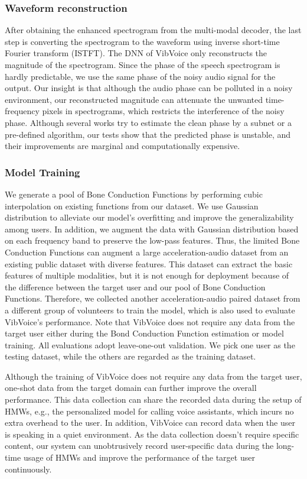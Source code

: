 \subsubsection{\textbf{Waveform reconstruction}}
After obtaining the enhanced spectrogram from the multi-modal decoder, the last step is converting the spectrogram to the waveform using inverse short-time Fourier transform (ISTFT). The DNN of VibVoice only reconstructs the magnitude of the spectrogram. Since the phase of the speech spectrogram is hardly predictable, we use the same phase of the noisy audio signal for the output. Our insight is that although the audio phase can be polluted in a noisy environment, our reconstructed magnitude can attenuate the unwanted time-frequency pixels in spectrograms, which restricts the interference of the noisy phase. Although several works \citep{sun2021ultrase,zhang2021sensing} try to estimate the clean phase by a subnet or a pre-defined algorithm, our tests show that the predicted phase is unstable, and their improvements are marginal and computationally expensive.

\subsubsection{\textbf{Model Training}}
\label{sec:vibvoice_training}
We generate a pool of Bone Conduction Functions by performing cubic interpolation on existing functions from our dataset. We use Gaussian distribution to alleviate our model's overfitting and improve the generalizability among users. In addition, we augment the data with Gaussian distribution based on each frequency band to preserve the low-pass features.
Thus, the limited Bone Conduction Functions can augment a large acceleration-audio dataset from an existing public dataset with diverse features. This dataset can extract the basic features of multiple modalities, but it is not enough for deployment because of the difference between the target user and our pool of Bone Conduction Functions. 
Therefore, we collected another acceleration-audio paired dataset from a different group of volunteers to train the model, which is also used to evaluate VibVoice's performance. 
Note that VibVoice does not require any data from the target user either during the Bond Conduction Function estimation or model training.
All evaluations adopt leave-one-out validation. We pick one user as the testing dataset, while the others are regarded as the training dataset. 

Although the training of VibVoice does not require any data from the target user, one-shot data from the target domain can further improve the overall performance. This data collection can share the recorded data during the setup of HMWs, e.g., the personalized model for calling voice assistants, which incurs no extra overhead to the user. In addition, VibVoice can record data when the user is speaking in a quiet environment. As the data collection doesn't require specific content, our system can unobtrusively record user-specific data during the long-time usage of HMWs and improve the performance of the target user continuously. 

